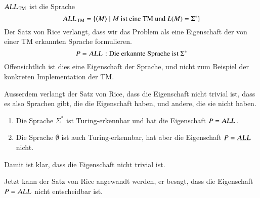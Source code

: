 \begin{beispiel}
%
$\text{\textsl{ALL}}_{\text{TM}}$ ist die Sprache
\[
\text{\textsl{ALL}}_{\text{TM}}=\{
\langle M\rangle\;|\; \text{$M$ ist eine TM und $L(M)=\Sigma^*$}
\}
\]
Der Satz von Rice verlangt, dass wir das Problem als eine Eigenschaft
der von einer TM erkannten Sprache formulieren.
\[
P=\text{\textsl{ALL}}:\text{Die erkannte Sprache ist $\Sigma^*$}
\]
Offensichtlich ist dies eine Eigenschaft der Sprache, und nicht zum
Beispiel der konkreten Implementation der TM.

Ausserdem verlangt der Satz von Rice, dass die Eigenschaft nicht trivial ist,
dass es also Sprachen gibt, die die Eigenschaft haben, und andere, die
sie nicht haben.
\begin{enumerate}
\item Die Sprache $\Sigma^*$ ist Turing-erkennbar und hat die Eigenschaft
$P=\text{\textsl{ALL}}$.
\item Die Sprache $\emptyset$ ist auch Turing-erkennbar, hat aber die
Eigenschaft
$P=\text{\textsl{ALL}}$ nicht.
\end{enumerate}
Damit ist klar, dass die Eigenschaft nicht trivial ist.

Jetzt kann der Satz von Rice angewandt werden, er besagt, dass die
Eigenschaft
$P=\text{\textsl{ALL}}$ nicht entscheidbar ist.
\end{beispiel}

